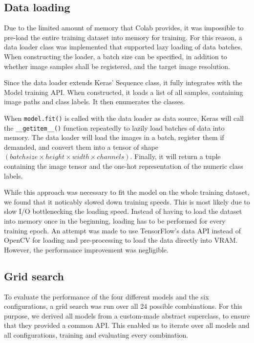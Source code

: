\documentclass{l4proj}
\begin{document}
\subsection{Data loading}

Due to the limited amount of memory that Colab provides, it was impossible to pre-load the entire training dataset into memory for training. For this reason, a data loader class was implemented that supported lazy loading of data batches. When constructing the loader, a batch size can be specified, in addition to whether image samples shall be registered, and the target image resolution. 

Since the data loader extends Keras' Sequence class, it fully integrates with the Model training API. When constructed, it loads a list of all samples, containing image paths and class labels. It then enumerates the classes.

When \lstinline{model.fit()} is called with the data loader as data source, Keras will call the \lstinline{__getitem__()} function repeatedly to lazily load batches of data into memory. The data loader will load the images in a batch, register them if demanded, and convert them into a tensor of shape $(batch size \times height \times width \times channels)$. Finally, it will return a tuple containing the image tensor and the one-hot representation of the numeric class labels.

While this approach was necessary to fit the model on the whole training dataset, we found that it noticably slowed down training speeds. This is most likely due to slow I/O bottlenecking the loading speed. Instead of having to load the dataset into memory once in the beginning, loading has to be performed for every training epoch. An attempt was made to use TensorFlow's data API instead of OpenCV for loading and pre-processing to load the data directly into VRAM. However, the performance improvement was negligible.


\subsection{Grid search}

To evaluate the performance of the four different models and the six configurations, a grid search was run over all 24 possible combinations. For this purpose, we derived all models from a custom-made abstract superclass, to ensure that they provided a common API. This enabled us to iterate over all models and all configurations, training and evaluating every combination.
\end{document}
